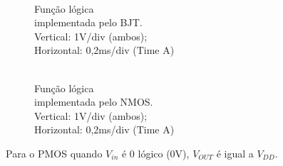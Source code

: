 \documentclass[pdftex,12pt,a4paper]{report}
\begin{document}
\begin{figure}[!htb]
  \centerline{}
  \caption{\\Função lógica \\implementada pelo BJT. \\Vertical: 1V/div (ambos); \\Horizontal: 0,2ms/div (Time A)}\label{bjt}
\endminipage\hfill
{}
  \centerline{}
  \caption{\\Função lógica \\implementada pelo NMOS. \\Vertical: 1V/div (ambos); \\Horizontal: 0,2ms/div (Time A)}\label{fig:nmos}
\endminipage\hfill
\end{figure}

\newpage
Para o PMOS quando $V_{in}$ é 0 lógico (0V), $V_{OUT}$ é igual a $V_{DD}$.
\end{document}
